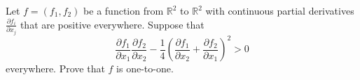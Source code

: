 Let $f=\left(f_1,f_2\right)$ be a function from $\mathbb{R}^2$ to $\mathbb{R}^2$ with continuous partial derivatives $\frac{\partial f_i}{\partial x_j}$ that are positive everywhere. Suppose that \[\frac{\partial f_1}{\partial x_1}\frac{\partial f_2}{\partial x_2}-\frac{1}{4}\left(\frac{\partial f_1}{\partial x_2}+\frac{\partial f_2}{\partial x_1}\right)^2>0\] everywhere. Prove that $f$ is one-to-one.